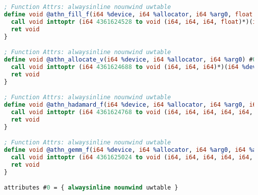 \begin{lstlisting}[language=llvm,caption=Пример LLVM IR]
; Function Attrs: alwaysinline nounwind uwtable
define void @athn_fill_f(i64 %device, i64 %allocator, i64 %arg0, float %arg1) #0 {
  call void inttoptr (i64 4361624528 to void (i64, i64, i64, float)*)(i64 %device, i64 %allocator, i64 %arg0, float %arg1)
  ret void
}

; Function Attrs: alwaysinline nounwind uwtable
define void @athn_allocate_v(i64 %device, i64 %allocator, i64 %arg0) #0 {
  call void inttoptr (i64 4361624688 to void (i64, i64, i64)*)(i64 %device, i64 %allocator, i64 %arg0)
  ret void
}

; Function Attrs: alwaysinline nounwind uwtable
define void @athn_hadamard_f(i64 %device, i64 %allocator, i64 %arg0, i64 %arg1, i64 %arg2, i64 %arg3) #0 {
  call void inttoptr (i64 4361624768 to void (i64, i64, i64, i64, i64, i64)*)(i64 %device, i64 %allocator, i64 %arg0, i64 %arg1, i64 %arg2, i64 %arg3)
  ret void
}

; Function Attrs: alwaysinline nounwind uwtable
define void @athn_gemm_f(i64 %device, i64 %allocator, i64 %arg0, i64 %arg1, i64 %arg2, i64 %arg3) #0 {
  call void inttoptr (i64 4361625024 to void (i64, i64, i64, i64, i64, i64)*)(i64 %device, i64 %allocator, i64 %arg0, i64 %arg1, i64 %arg2, i64 %arg3)
  ret void
}

attributes #0 = { alwaysinline nounwind uwtable }
\end{lstlisting}

